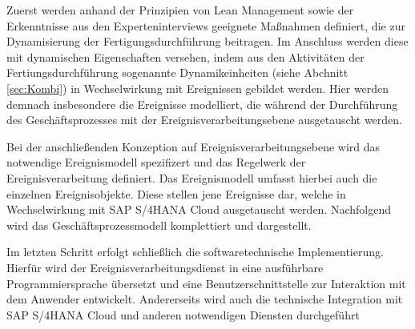 \newpage

Zuerst werden anhand der Prinzipien von Lean Management sowie der Erkenntnisse aus den Experteninterviews geeignete Maßnahmen definiert, die zur Dynamisierung der Fertigungsdurchführung beitragen.
Im Anschluss werden diese mit dynamischen Eigenschaften versehen, indem aus den Aktivitäten der Fertiungsdurchführung sogenannte Dynamikeinheiten (siehe Abchnitt \ref{sec:Kombi}) in Wechselwirkung mit Ereignissen gebildet werden. Hier werden demnach insbesondere die Ereignisse modelliert, die während der Durchführung des Geschäftsprozesses mit der Ereignisverarbeitungsebene ausgetauscht werden.

Bei der anschließenden Konzeption auf Ereignisverarbeitungsebene  wird das notwendige Ereignismodell spezifizert und das Regelwerk der Ereignisverarbeitung definiert. Das Ereignismodell umfasst hierbei auch die einzelnen Ereignisobjekte. Diese stellen jene Ereignisse dar, welche in Wechselwirkung mit SAP S/4HANA Cloud ausgetauscht werden. Nachfolgend wird das Geschäftsprozessmodell komplettiert und dargestellt.

Im letzten Schritt erfolgt schließlich die softwaretechnische Implementierung. Hierfür wird der Ereignisverarbeitungsdienst in eine ausführbare Programmiersprache übersetzt und eine Benutzerschnittstelle zur Interaktion mit dem Anwender entwickelt. Andererseits wird auch die technische Integration mit SAP S/4HANA Cloud und anderen notwendigen Diensten durchgeführt 